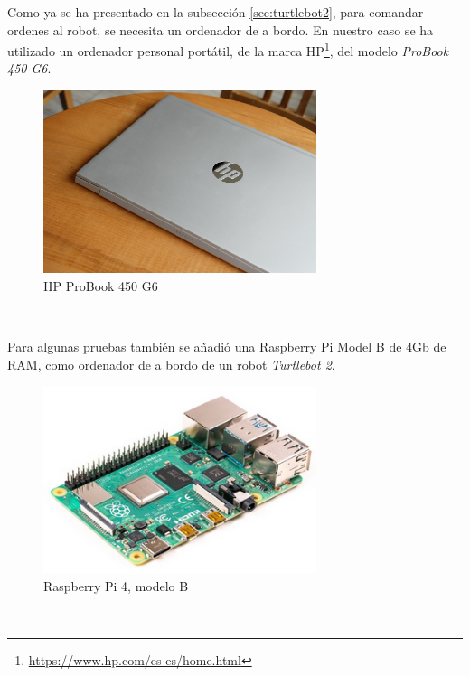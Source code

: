Como ya se ha presentado en la subsección \ref{sec:turtlebot2}, para comandar
ordenes al robot, se necesita un ordenador de a bordo.
En nuestro caso se ha utilizado un ordenador personal portátil, de la marca
HP\footnote{\url{https://www.hp.com/es-es/home.html}}, del modelo
\textit{ProBook 450 G6}.

\begin{figure} [h!]
  \begin{center}
    \includegraphics[width=8cm]{figs/hp_probook}
  \end{center}
  \caption{HP ProBook 450 G6 \cite{hp_probook}}
  \label{fig:hp_probook}
\end{figure}\

Para algunas pruebas también se añadió una Raspberry Pi Model B de 4Gb de RAM,
como ordenador de a bordo de un robot \textit{Turtlebot 2}.

\begin{figure} [h!]
  \begin{center}
    \includegraphics[width=8cm]{figs/raspberry_pi_4b}
  \end{center}
  \caption{Raspberry Pi 4, modelo B \cite{raspberry_pi_4b}}
  \label{fig:raspberry_pi}
\end{figure}\


